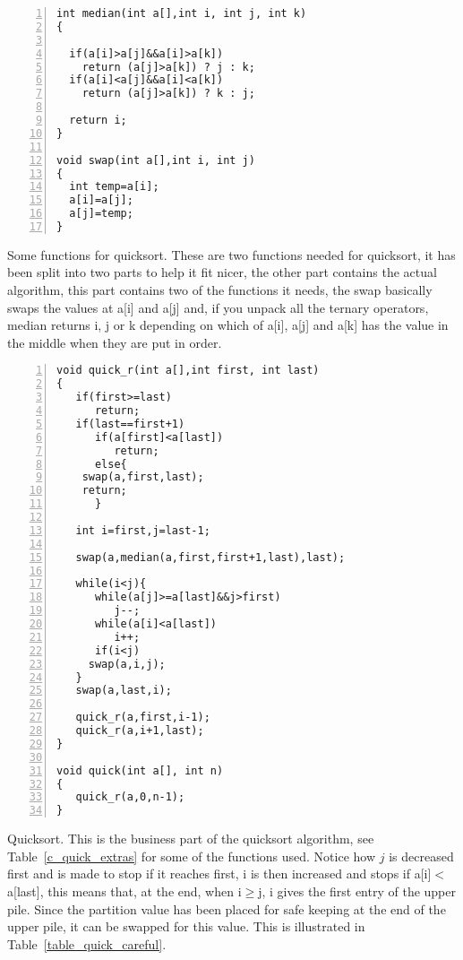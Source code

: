 \documentclass[11pt,a4paper]{scrartcl}
\begin{document}
\begin{table}
\begin{lstlisting}[numbers=left]
int median(int a[],int i, int j, int k)
{

  if(a[i]>a[j]&&a[i]>a[k])
    return (a[j]>a[k]) ? j : k;
  if(a[i]<a[j]&&a[i]<a[k])
    return (a[j]>a[k]) ? k : j;

  return i;
}

void swap(int a[],int i, int j)
{
  int temp=a[i];
  a[i]=a[j];
  a[j]=temp;
}
\end{lstlisting}
\caption{Some functions for quicksort. These are two functions needed
  for quicksort, it has been split into two parts to help it fit
  nicer, the other part contains the actual algorithm, this part
  contains two of the functions it needs, the swap basically swaps the
  values at a[i] and a[j] and, if you unpack all the ternary
  operators, median returns i, j or k depending on which of a[i], a[j]
  and a[k] has the value in the middle when they are put in
  order.\label{c_quick_extras}}
\end{table}

\begin{table}
\begin{lstlisting}[numbers=left]
void quick_r(int a[],int first, int last)
{
   if(first>=last)
      return;
   if(last==first+1)
      if(a[first]<a[last])
         return;
      else{
	swap(a,first,last);
	return;
      }

   int i=first,j=last-1;

   swap(a,median(a,first,first+1,last),last);
  
   while(i<j){
      while(a[j]>=a[last]&&j>first)
         j--;
      while(a[i]<a[last])
         i++;
      if(i<j)
	 swap(a,i,j);
   }
   swap(a,last,i);

   quick_r(a,first,i-1);
   quick_r(a,i+1,last);
}

void quick(int a[], int n)
{
   quick_r(a,0,n-1);
}
\end{lstlisting}
\caption{Quicksort. This is the business part of the quicksort
  algorithm, see Table~\ref{c_quick_extras} for some of the functions
  used. Notice how $j$ is decreased first and is made to stop if it
  reaches first, i is then increased and stops if a[i]$<$a[last], this
  means that, at the end, when i$\ge$j, i gives the first entry of the
  upper pile. Since the partition value has been placed for safe
  keeping at the end of the upper pile, it can be swapped for this
  value. This is illustrated in
  Table~\ref{table_quick_careful}.\label{c_quick}}
\end{table}
\end{document}
